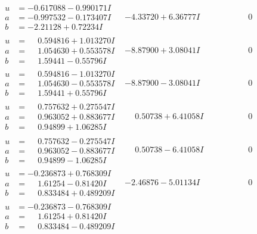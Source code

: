 \documentclass[1p]{elsarticle_modified}
\theoremstyle{definition}
\begin{document}
$$\begin{array}{c|c|c}
\begin{aligned}
u &= -0.617088 - 0.990171 I \\
a &= -0.997532 - 0.173407 I \\
b &= -2.21128 + 0.72234 I\end{aligned}
 & -4.33720 + 6.36777 I & \phantom{-0.000000 } 0 \\ \hline\begin{aligned}
u &= \phantom{-}0.594816 + 1.013270 I \\
a &= \phantom{-}1.054630 + 0.553578 I \\
b &= \phantom{-}1.59441 - 0.55796 I\end{aligned}
 & -8.87900 + 3.08041 I & \phantom{-0.000000 } 0 \\ \hline\begin{aligned}
u &= \phantom{-}0.594816 - 1.013270 I \\
a &= \phantom{-}1.054630 - 0.553578 I \\
b &= \phantom{-}1.59441 + 0.55796 I\end{aligned}
 & -8.87900 - 3.08041 I & \phantom{-0.000000 } 0 \\ \hline\begin{aligned}
u &= \phantom{-}0.757632 + 0.275547 I \\
a &= \phantom{-}0.963052 + 0.883677 I \\
b &= \phantom{-}0.94899 + 1.06285 I\end{aligned}
 & \phantom{-}0.50738 + 6.41058 I & \phantom{-0.000000 } 0 \\ \hline\begin{aligned}
u &= \phantom{-}0.757632 - 0.275547 I \\
a &= \phantom{-}0.963052 - 0.883677 I \\
b &= \phantom{-}0.94899 - 1.06285 I\end{aligned}
 & \phantom{-}0.50738 - 6.41058 I & \phantom{-0.000000 } 0 \\ \hline\begin{aligned}
u &= -0.236873 + 0.768309 I \\
a &= \phantom{-}1.61254 - 0.81420 I \\
b &= \phantom{-}0.833484 + 0.489209 I\end{aligned}
 & -2.46876 - 5.01134 I & \phantom{-0.000000 } 0 \\ \hline\begin{aligned}
u &= -0.236873 - 0.768309 I \\
a &= \phantom{-}1.61254 + 0.81420 I \\
b &= \phantom{-}0.833484 - 0.489209 I\end{aligned}

\end{array}$$
\end{document}
